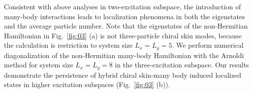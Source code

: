 \documentclass[longbibliography, aps, prx, amsmath, amssymb, amsfonts, twocolumn,superscriptaddress, footinbib]{revtex4-1}
\begin{document}
	Consistent with above analyses in two-excitation subspace, the introduction of many-body interactions leads to localization phenomena in both the eigenstates and the average particle number.
	Note that the eigenstates of the non-Hermitian Hamiltonian in Fig.~\ref{fig:03} (a) is not three-particle chiral skin modes, because the calculation is restriction to system size $L_x=L_y=5$.
	We perform numerical diagonalization of the non-Hermitian many-body Hamiltonian with the Arnoldi method for system size $L_x = L_y = 8$ in the three-excitation subspace. Our results demonstrate the persistence of hybrid chiral skin-many body induced localized states in higher excitation subspaces (Fig.~\ref{fig:03} (b)).
\end{document}
